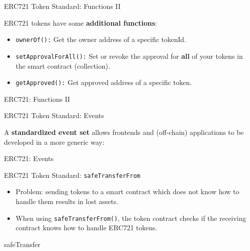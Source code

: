 \documentclass[handout]{beamer}
\begin{document}
\begin{frame}{ERC721 Token Standard: Functions II}

ERC721 tokens have some \textbf{additional functions}:

\begin{itemize}
	\item<2-> \texttt{ownerOf():} {Get the owner address of a specific tokenId.}
	\item<3-> \texttt{setApprovalForAll():} {Set or revoke the approval for \textbf{all} of your tokens in the smart contract (collection).}
	\item<4-> \texttt{getApproved():} {Get approved address of a specific token.}	
\end{itemize}

\vspace{1em}
	\begin{samplecode}{ERC721: Functions II}
		
	\end{samplecode}
\end{frame}

\begin{frame}{ERC721 Token Standard: Events}

	A \textbf{standardized event set} allows frontends and (off-chain) applications to be developed in a more generic way:
\vspace{1em}
	\begin{samplecode}{ERC721: Events}
		
	\end{samplecode}
\end{frame}

\begin{frame}{ERC721 Token Standard: \texttt{safeTransferFrom}}

\begin{itemize}
	\item Problem: sending tokens to a smart contract which does not know how to handle them results in lost assets.
	\item When using \texttt{safeTransferFrom()}, the token contract checks if the receiving contract knows how to handle ERC721 tokens. 
\end{itemize}
\vspace{1em}
	\begin{samplecode}{safeTransfer}
		
	\end{samplecode}
\end{frame}
\end{document}
